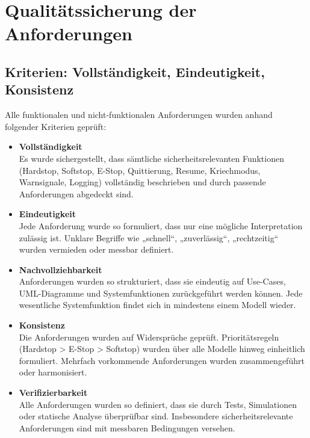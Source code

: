 \section{Qualitätssicherung der Anforderungen}

\subsection{Kriterien: Vollständigkeit, Eindeutigkeit, Konsistenz}

Alle funktionalen und nicht-funktionalen Anforderungen wurden anhand folgender Kriterien geprüft:

\begin{itemize}
    \item \textbf{Vollständigkeit}\\
    Es wurde sichergestellt, dass sämtliche sicherheitsrelevanten Funktionen (\ac{Hardstop}, \ac{Softstop}, \ac{E-Stop}, Quittierung, Resume, Kriechmodus, Warnsignale, Logging) vollständig beschrieben und durch passende Anforderungen abgedeckt sind.

    \item \textbf{Eindeutigkeit}\\
    Jede Anforderung wurde so formuliert, dass nur eine mögliche Interpretation zulässig ist. Unklare Begriffe wie „schnell“, „zuverlässig“, „rechtzeitig“ wurden vermieden oder messbar definiert.

    \item \textbf{Nachvollziehbarkeit}\\
    Anforderungen wurden so strukturiert, dass sie eindeutig auf Use-Cases, UML-Diagramme und Systemfunktionen zurückgeführt werden können. Jede wesentliche Systemfunktion findet sich in mindestens einem Modell wieder.

    \item \textbf{Konsistenz}\\
    Die Anforderungen wurden auf Widersprüche geprüft. Prioritätsregeln (\ac{Hardstop} > \ac{E-Stop} > \ac{Softstop}) wurden über alle Modelle hinweg einheitlich formuliert. Mehrfach vorkommende Anforderungen wurden zusammengeführt oder harmonisiert.

    \item \textbf{Verifizierbarkeit}\\
    Alle Anforderungen wurden so definiert, dass sie durch Tests, Simulationen oder statische Analyse überprüfbar sind. Insbesondere sicherheitsrelevante Anforderungen sind mit messbaren Bedingungen versehen.
\end{itemize}

